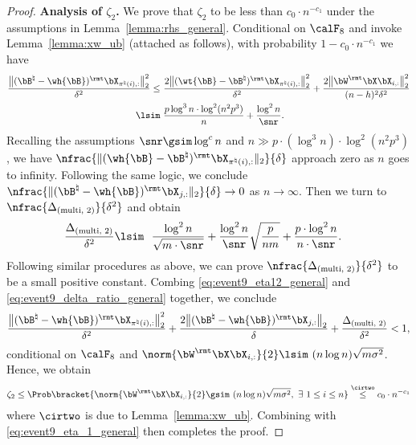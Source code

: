 \documentclass[11pt]{article}
\def \bBtrue {\bB^{\natural}}
\begin{document}
\begin{proof}
\vspace{0.1in}\noindent
\textbf{Analysis of $\zeta_2$.}
We prove that $\zeta_2$ to be less than $c_0\cdot n^{-c_1}$ under the assumptions in
Lemma~\ref{lemma:rhs_general}.
Conditional on $\calF_8$ and invoke Lemma~\ref{lemma:xw_ub} (attached as follows),
with probability $1-c_0 \cdot n^{-c_1}$ we have
\begin{align}
\frac{\big\|(\bBtrue - \wh{\bB}  )^{\rmt} \bX_{\pi^{\natural}(i), :} \big\|^2_{2}}{\delta^2}
\leq~& \frac{2\big\|(\wt{\bB} - \bBtrue )^{\rmt} \bX_{\pi^{\natural}(i), :} \big\|^2_{2}}{\delta^2}
+ \frac{2\big\|\bW^{\rmt}\bX \bX_{i, :}\big\|^2_2}{(n-h)^2 \delta^2} \notag \\
\lsim~&
\frac{p \log^3 n\cdot \log^2(n^2 p^3)}{n}
+ \frac{\log^2 n}{\snr}.
\label{eq:event9_eta12_general}
\end{align}
Recalling the assumptions $\snr \gsim \log^c n$ and $n \gg p\cdot (\log^3 n)\cdot \log^2(n^2p^3)$,
we have $\nfrac{\|(\wh{\bB} - \bBtrue )^{\rmt} \bX_{\pi^{\natural}(i), :}\|_{2}}{\delta}$
approach zero as $n$ goes to infinity.
Following the same logic, we conclude
$\nfrac{\|(\bBtrue - \wh{\bB})^{\rmt} \bX_{j, :} \|_{2}}{\delta} \rightarrow 0$
as $n\rightarrow \infty$.
Then we turn to $\nfrac{\Delta_{(\textup{multi, 2})}}{\delta^2}$ and obtain
\begin{align}
\frac{\Delta_{(\textup{multi, 2})}}{\delta^2} \lsim~& \
\frac{\log^2 n}{\sqrt{m \cdot \snr}}
+ \frac{ \log^2 n}{\snr}
\sqrt{\frac{p}{nm}} +
\frac{p\cdot \log^2 n }{n\cdot \snr}.
\label{eq:event9_delta_ratio_general}
\end{align}
Following similar procedures as above, we can prove
$\nfrac{\Delta_{(\textup{multi, 2})}}{\delta^2}$ to be a small positive constant.
Combing \eqref{eq:event9_eta12_general} and \eqref{eq:event9_delta_ratio_general} together,
we conclude
\[
\frac{\big\|(\bBtrue - \wh{\bB})^{\rmt} \bX_{\pi^{\natural}(i), :} \big\|_{2}^2}{\delta^2} + \frac{2\big\|(\bBtrue - \wh{\bB})^{\rmt} \bX_{j, :} \big\|_{2}}{\delta} + \frac{\Delta_{(\textup{multi, 2})}}{\delta^2} < 1,
\]
conditional on $\calF_8$ and $\norm{\bW^{\rmt}\bX \bX_{i, :} }{2} \lsim \
(n\log n)\sqrt{m \sigma^2}$.
Hence, we obtain
\begin{align}
\label{eq:medium_xw_relation}
\zeta_2 \leq \Prob\bracket{\norm{\bW^{\rmt}\bX \bX_{i, :} }{2} \gsim \
(n\log n)\sqrt{m \sigma^2},~\exists~1\leq i \leq n }
\stackrel{\cirtwo}{\leq} c_0 \cdot n^{-c_1}
\end{align}
where $\cirtwo$ is due to
Lemma~\ref{lemma:xw_ub}.
Combining with \eqref{eq:event9_eta_1_general} then
completes the proof.
\end{proof}
\end{document}
